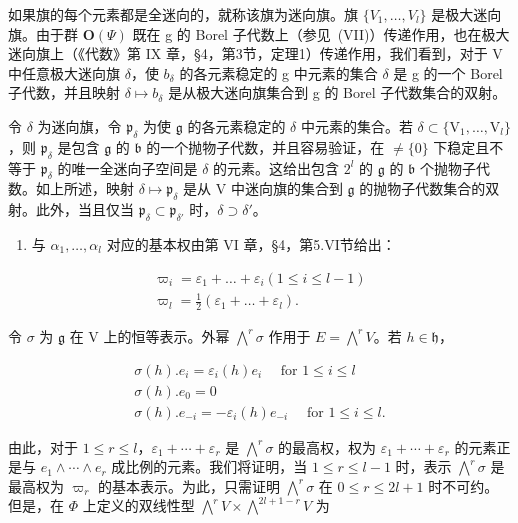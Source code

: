 如果旗的每个元素都是全迷向的，就称该旗为迷向旗。旗 \(\{V_{1},\ldots,V_{l}\}\) 是极大迷向旗。由于群 \(\mathbf{O}(\varPsi)\) 既在 g 的 Borel 子代数上（参见~(VII)）传递作用，也在极大迷向旗上（《代数》第 IX 章，§4，第3节，定理1）传递作用，我们看到，对于 V 中任意极大迷向旗 \(\delta\)，使 \(b_{\delta}\) 的各元素稳定的 g 中元素的集合 \(\delta\) 是 g 的一个 Borel 子代数，并且映射 \(\delta\mapsto b_{\delta}\) 是从极大迷向旗集合到 g 的 Borel 子代数集合的双射。

令 \(\delta\) 为迷向旗，令 \(\mathfrak{p}_{\delta}\) 为使 \(\mathfrak{g}\) 的各元素稳定的 \(\delta\) 中元素的集合。若 \(\delta \subset \{\mathrm{V}_1, \ldots, \mathrm{V}_l\}\)，则 \(\mathfrak{p}_{\delta}\) 是包含 \(\mathfrak{g}\) 的 \(\mathfrak{b}\) 的一个抛物子代数，并且容易验证，在 \(\neq \{0\}\) 下稳定且不等于 \(\mathfrak{p}_{\delta}\) 的唯一全迷向子空间是 \(\delta\) 的元素。这给出包含 \(2^l\) 的 \(\mathfrak{g}\) 的 \(\mathfrak{b}\) 个抛物子代数。如上所述，映射 \(\delta \mapsto \mathfrak{p}_{\delta}\) 是从 V 中迷向旗的集合到 \(\mathfrak{g}\) 的抛物子代数集合的双射。此外，当且仅当 \(\mathfrak{p}_{\delta} \subset \mathfrak{p}_{\delta'}\) 时，\(\delta \supset \delta'\)。

\begin{enumerate}
\def\labelenumi{(\Roman{enumi})}
\setcounter{enumi}{3}
\tightlist
\item
  与 \(\alpha_{1},\ldots,\alpha_{l}\) 对应的基本权由第 VI 章，§4，第5.VI节给出：
\end{enumerate}

\[
\begin{array}{l} \varpi_ {i} = \varepsilon_ {1} + \dots + \varepsilon_ {i} (1 \leq i \leq l - 1) \\ \varpi_ {l} = \frac {1}{2} (\varepsilon_ {1} + \dots + \varepsilon_ {l}). \end{array}
\]

令 \(\sigma\) 为 \(\mathfrak{g}\) 在 V 上的恒等表示。外幂 \(\bigwedge^{r}\sigma\) 作用于 \(E = \bigwedge^{r}V\)。若 \(h\in \mathfrak{h}\)，

\[
\begin{array}{l} \sigma (h). e _ {i} = \varepsilon_ {i} (h) e _ {i} \quad \text { for } 1 \leq i \leq l \\ \sigma (h). e _ {0} = 0 \\ \sigma (h). e _ {- i} = - \varepsilon_ {i} (h) e _ {- i} \quad \text { for } 1 \leq i \leq l. \end{array}
\]

由此，对于 \(1 \leq r \leq l\)，\(\varepsilon_{1} + \cdots + \varepsilon_{r}\) 是 \(\bigwedge^{r}\sigma\) 的最高权，权为 \(\varepsilon_{1} + \cdots + \varepsilon_{r}\) 的元素正是与 \(e_{1} \wedge \cdots \wedge e_{r}\) 成比例的元素。我们将证明，当 \(1 \leq r \leq l - 1\) 时，表示 \(\bigwedge^{r}\sigma\) 是最高权为 \(\varpi_{r}\) 的基本表示。为此，只需证明 \(\bigwedge^{r}\sigma\) 在 \(0 \leq r \leq 2l + 1\) 时不可约。但是，在 \(\Phi\) 上定义的双线性型 \(\bigwedge^{r}V \times \bigwedge^{2l+1-r}V\) 为

